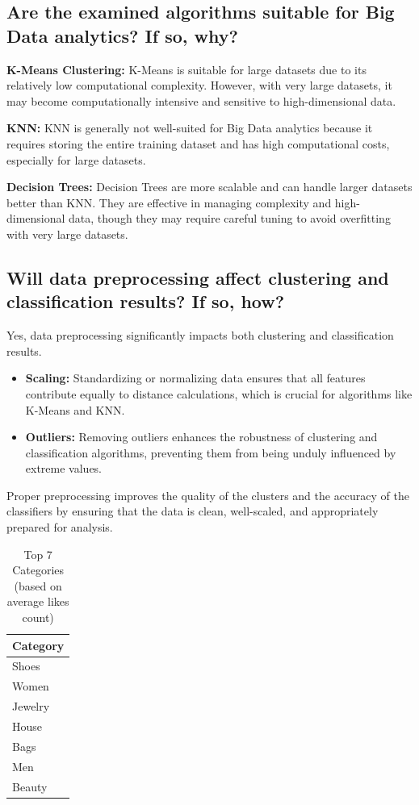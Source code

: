 \documentclass[a4paper,11pt]{article}
\begin{document}
\subsection{Are the examined algorithms suitable for Big Data analytics? If so, why?}

\noindent
\textbf{K-Means Clustering:} K-Means is suitable for large datasets due to its relatively low computational complexity. However, with very large datasets, it may become computationally intensive and sensitive to high-dimensional data. 

\noindent
\textbf{KNN:} KNN is generally not well-suited for Big Data analytics because it requires storing the entire training dataset and has high computational costs, especially for large datasets.

\noindent
\textbf{Decision Trees:} Decision Trees are more scalable and can handle larger datasets better than KNN. They are effective in managing complexity and high-dimensional data, though they may require careful tuning to avoid overfitting with very large datasets.

\subsection{Will data preprocessing affect clustering and classification results? If so, how?}

\noindent
Yes, data preprocessing significantly impacts both clustering and classification results. 
\begin{itemize}
    \item \textbf{Scaling:} Standardizing or normalizing data ensures that all features contribute equally to distance calculations, which is crucial for algorithms like K-Means and KNN.
    \item \textbf{Outliers:} Removing outliers enhances the robustness of clustering and classification algorithms, preventing them from being unduly influenced by extreme values.
\end{itemize}
Proper preprocessing improves the quality of the clusters and the accuracy of the classifiers by ensuring that the data is clean, well-scaled, and appropriately prepared for analysis.



\begin{table}[h!]
    \centering
    \caption{Top 7 Categories (based on average likes count)}
    \begin{tabular}{|l|}
        \hline
        \textbf{Category} \\
        \hline
        Shoes \\
        Women \\
        Jewelry \\
        House \\
        Bags \\
        Men \\
        Beauty \\
        \hline
    \end{tabular}
\end{table}
\end{document}
